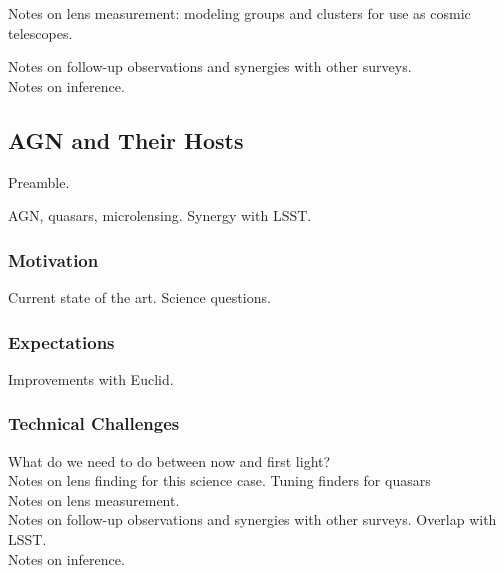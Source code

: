 \documentclass[twocolumn]{svjour3}
\begin{document}
Notes on lens measurement: modeling groups and clusters for use as
cosmic telescopes.

Notes on follow-up observations and synergies with other surveys.\\

Notes on inference.\\



\subsection{AGN and Their Hosts}



Preamble.

AGN, quasars, microlensing.
Synergy with LSST.

\subsubsection{Motivation}
Current state of the art. Science questions.\\

\subsubsection{Expectations}
Improvements with Euclid.\\

\subsubsection{Technical Challenges}

What do we need to do between now and first light?\\

Notes on lens finding for this science case. Tuning finders for
quasars\\

Notes on lens measurement.\\

Notes on follow-up observations and synergies with other surveys.
Overlap with LSST.\\

Notes on inference.\\
\end{document}

